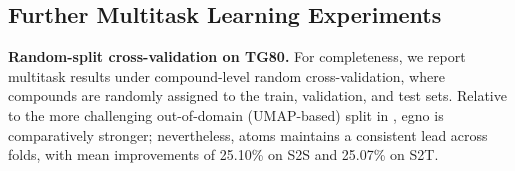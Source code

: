 \subsection{Further Multitask Learning Experiments}

\label{sect:random_split}
\textbf{Random-split cross-validation on TG80.} For completeness, we report multitask results under compound-level random cross-validation, where compounds are randomly assigned to the train, validation, and test sets. Relative to the more challenging out-of-domain (UMAP-based) split in , \gls{egno} is comparatively stronger; nevertheless, \gls{atoms} maintains a consistent lead across folds, with mean improvements of 25.10\% on S2S and 25.07\% on S2T.

\begin{table}[H]
  \centering
  \caption{S2S \gls{mse} \((\times10^{-2})\) on TG80 across five random cluster assignments.}
  \label{tab:tg80_random_s2s}
\end{table}


